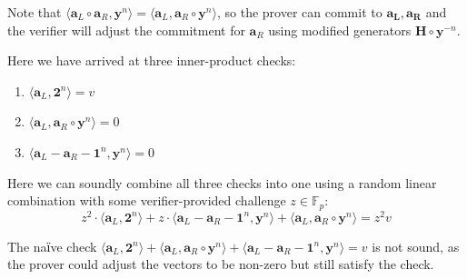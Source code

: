 \documentclass[../lecture-notes-148x210.tex]{subfiles}
\begin{document}
Note that $\langle \mathbf{a}_L \circ \mathbf{a}_R, \mathbf{y}^n \rangle = \langle \mathbf{a}_L, \mathbf{a}_R \circ \mathbf{y}^n \rangle$, so the prover can commit to $\mathbf{a_L, a_R}$ and the verifier will adjust the commitment for $\mathbf{a}_R$ using modified generators $\mathbf{H} \circ \mathbf{y}^{-n}$.

Here we have arrived at three inner-product checks:
\begin{enumerate}
    \item $\langle \mathbf{a}_L, \mathbf{2}^n \rangle = v$
    \item $\langle \mathbf{a}_L, \mathbf{a}_R \circ \mathbf{y}^n \rangle = 0$
    \item $\langle \mathbf{a}_L - \mathbf{a}_R - \mathbf{1}^n, \mathbf{y}^n \rangle = 0$
\end{enumerate}

Here we can soundly combine all three checks into one using a random linear combination with some verifier-provided challenge $z \in \mathbb{F}_p$:
$$z^2 \cdot \langle \mathbf{a}_L, \mathbf{2}^n \rangle + z \cdot \langle \mathbf{a}_L - \mathbf{a}_R - \mathbf{1}^n, \mathbf{y}^n \rangle + \langle \mathbf{a}_L, \mathbf{a}_R \circ \mathbf{y}^n \rangle = z^2v$$

\begin{remark}
    The naїve check $\langle \mathbf{a}_L, \mathbf{2}^n \rangle + \langle \mathbf{a}_L, \mathbf{a}_R \circ \mathbf{y}^n \rangle + \langle \mathbf{a}_L - \mathbf{a}_R - \mathbf{1}^n, \mathbf{y}^n \rangle = v$ is not sound, as the prover could adjust the vectors to be non-zero but still satisfy the check.
\end{remark}
\end{document}
